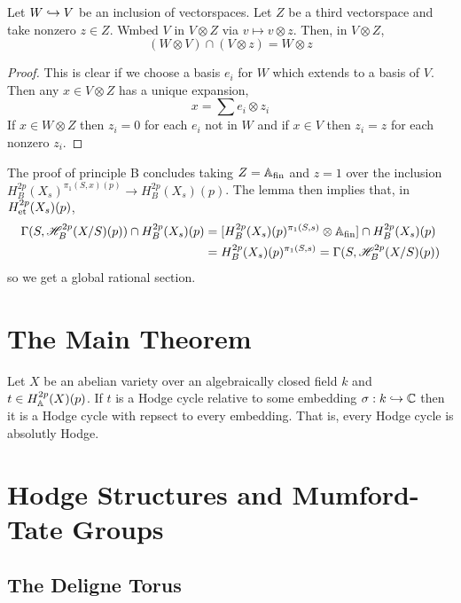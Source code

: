 \documentclass[12pt]{article}
\begin{document}
\begin{lemma}
Let $W \hookrightarrow V$ be an inclusion of vectorspaces. Let $Z$ be a third vectorspace and take nonzero $z \in Z$. Wmbed $V$ in $V \otimes Z$ via $v \mapsto v \otimes z$. Then, in $V \otimes Z$,
\[ (W \otimes V) \cap (V \otimes z) = W  \otimes z \]
\end{lemma}

\begin{proof}
This is clear if we choose a basis $e_i$ for $W$ which extends to a basis of $V$. Then any $x \in V \otimes Z$ has a unique expansion,
\[ x = \sum e_i \otimes z_i \]
If $x \in W \otimes Z$ then $z_i = 0$ for each $e_i$ not in $W$ and if $x \in V$ then $z_i = z$ for each nonzero $z_i$. 
\end{proof}

\begin{remark}
The proof of principle B concludes taking $Z = \mathbb{A}_{\mathrm{fin}}$ and $z = 1$ over the inclusion $H_B^{2 p}(X_s)^{\pi_1(S,x)(p)} \to H^{2 p}_B(X_s)(p)$. The lemma then implies that, in $H^{2 p}_{\mathrm{et}}(X_s)(p)$,
\begin{align*}
\Gamma(S, \mathscr{H}_B^{2 p}(X/S)(p)) \cap H^{2 p}_B(X_s)(p) & = [H^{2p}_B(X_s)(p)^{\pi_1(S, s)} \otimes \mathbb{A}_{\mathrm{fin}}] \cap H^{2 p}_B(X_s)(p) 
\\
& = H^{2 p}_B(X_s)(p)^{\pi_1(S,s)} = \Gamma(S, \mathscr{H}^{2p}_B(X/S)(p))
\end{align*}
so we get a global rational section.
\end{remark}


\section{The Main Theorem}

\begin{theorem}[Deligne]
Let $X$ be an abelian variety over an algebraically closed field $k$ and $t \in H^{2p}_{\mathbb{A}}(X)(p)$. If $t$ is a Hodge cycle relative to some embedding $\sigma : k \hookrightarrow \mathbb{C}$ then it is a Hodge cycle with repsect to every embedding. That is, every Hodge cycle is absolutly Hodge. 
\end{theorem}


\section{Hodge Structures and Mumford-Tate Groups}

\subsection{The Deligne Torus}
\end{document}
